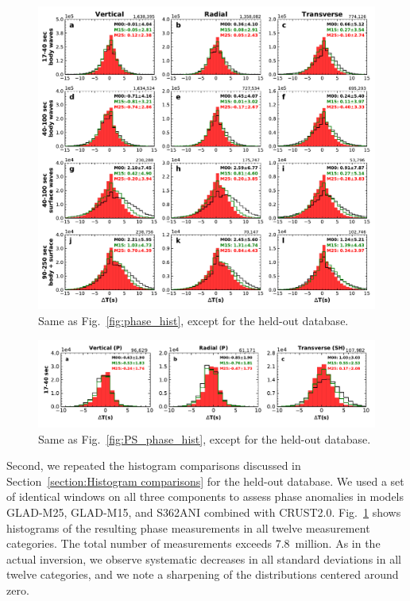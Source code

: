 \begin{figure}
  \centering
  \includegraphics[width=\textwidth]{ch-GLADM25/figures/dt_histogram_360.pdf}
  \caption[Histograms of amplitude measurements in all twelve measurement categories for held-out database]
  {\small{Same as Fig.~\ref{fig:phase_hist}, except for the held-out database.}}
  \label{fig:phase_hist_360}
\end{figure}

\begin{figure}
  \centering
  \includegraphics[width=\textwidth]{ch-GLADM25/figures/dt_histogram_360_phase.pdf}
  \caption[Histograms of 17--40~s traveltime anomalies of P and SH arrivals for held-out database]
  {\small{Same as Fig.~\ref{fig:PS_phase_hist}, except for the held-out database.}}
  \label{fig:phase_hist_360_P}
\end{figure}

Second, we repeated the histogram comparisons discussed in
Section~\ref{section:Histogram comparisons} for the held-out database.
We used a set of identical windows on all three components to assess
phase anomalies in models GLAD-M25, GLAD-M15, and S362ANI combined with CRUST2.0.
Fig.~\ref{fig:phase_hist_360} shows histograms of the resulting phase
measurements in all twelve measurement categories.
The total number of measurements exceeds 7.8~million.
As in the actual inversion,
we observe systematic decreases in all standard deviations in all twelve categories,
and we note a sharpening of the distributions centered around zero.

